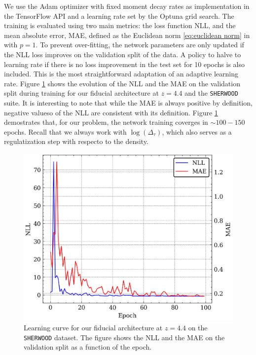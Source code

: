 We use the Adam optimizer with fixed moment decay rates as implementation in the TensorFlow API and a learning rate set by the Optuna grid search. The training is evaluated using two main metrics: the loss function NLL, and the mean absolute error, MAE, defined as the Euclidean norm \ref{eq:euclidean norm} in with $p=1$. To prevent over-fitting, the network parameters are only updated if the NLL loss improves on the validation split of the data. A policy to halve to learning rate if there is no loss improvement in the test set for 10 epochs is also included. This is the most straightforward adaptation of an adaptive learning rate. Figure \ref{fig:ML learning curve} shows the evolution of the NLL and the MAE on the validation split during training for our fiducial architecture at $z=4.4$ and the \texttt{SHERWOOD} suite. It is interesting to note that while the MAE is always positive by definition, negative valueso of the NLL are consistent with its definition. Figure \ref{fig:ML learning curve} demostrates that, for our problem, the network training coverges in $\sim 100-150$ epochs. Recall that we always work with $\log(\Delta_\tau)$, which also serves as a regulatization step with respecto to the density.


\begin{figure}
    \centering
    \includegraphics[width=0.7\linewidth]{img/ML/learning_curve.png}
    \caption{Learning curve for our fiducial architecture at $z=4.4$ on the \texttt{SHERWOOD} dataset. The figure shows the NLL and the MAE on the validation split as a function of the epoch.}
    \label{fig:ML learning curve}
\end{figure}

